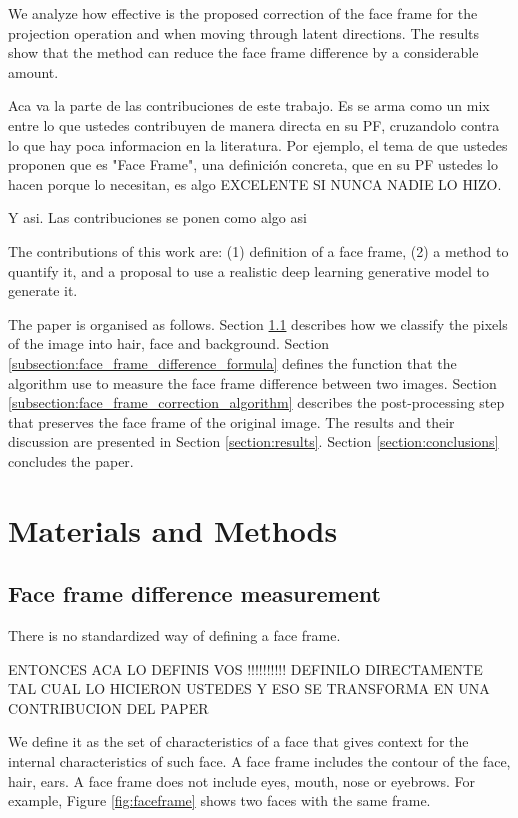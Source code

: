 \documentclass[review]{elsarticle}
\begin{document}
We analyze how effective is the proposed correction of the face frame for the projection operation and when moving through latent directions. The results show that the method can reduce the face frame difference by a considerable amount.


Aca va la parte de las contribuciones de este trabajo.  Es se arma como un mix entre lo que ustedes contribuyen de manera directa en su PF, cruzandolo contra lo que hay poca informacion en la literatura.  Por ejemplo, el tema de que ustedes proponen que es "Face Frame", una definición concreta, que en su PF ustedes lo hacen porque lo necesitan, es algo EXCELENTE SI NUNCA NADIE LO HIZO.

Y asi.  Las contribuciones se ponen como algo asi

The contributions of this work are: (1) definition of a face frame, (2) a method to quantify it, and a proposal to use a realistic  deep learning generative model to generate it. 

The paper is organised as follows. Section \ref{subsection:face_frame_difference_measurement} describes how we classify the pixels of the image into hair, face and background. Section \ref{subsection:face_frame_difference_formula} defines the function that the algorithm use to measure the face frame difference between two images. Section \ref{subsection:face_frame_correction_algorithm} describes the post-processing step that preserves the face frame of the original image. The results and their discussion are presented in Section \ref{section:results}. Section \ref{section:conclusions} concludes the paper.

\section{Materials and Methods}\label{section:materials_and_methods}
\subsection{Face frame difference measurement}\label{subsection:face_frame_difference_measurement}

There is no standardized way of defining a face frame. 

ENTONCES ACA LO DEFINIS VOS !!!!!!!!!!  DEFINILO DIRECTAMENTE TAL CUAL LO HICIERON USTEDES Y ESO SE TRANSFORMA EN UNA CONTRIBUCION DEL PAPER

We define it as the set of characteristics of a face that gives context for the internal characteristics of such face. A face frame includes the contour of the face, hair, ears. A face frame does not include eyes, mouth, nose or eyebrows. For example, Figure \ref{fig:faceframe} shows two faces with the same frame.
\end{document}
